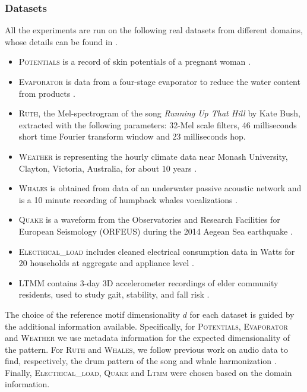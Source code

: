 \subsubsection*{Datasets}
All the experiments are run on the following real datasets from different domains, whose details can be found in .
\begin{itemize}
    \item \textsc{Potentials} is a record of skin potentials of a pregnant woman \cite{DaISyPREG}.
    \item \textsc{Evaporator} is data from a four-stage evaporator to reduce the water content from products \cite{DaISyEVAP}.
    \item \textsc{Ruth}, the Mel-spectrogram of the song \textit{Running Up That Hill} by Kate Bush, extracted with the following parameters: 32-Mel scale filters, 46 milliseconds short time Fourier transform window and 23 milliseconds hop.
    \item \textsc{Weather} is representing the hourly climate data near Monash University, Clayton, Victoria, Australia, for about $10$ years \cite{godahewa_2021_5184708}.
    \item \textsc{Whales} is obtained from data of an underwater passive acoustic network and is a 10 minute recording of humpback whales vocalizations \cite{NOAA_PIPAN_2021}.
    \item \textsc{Quake} is a waveform from the Observatories and Research Facilities for European Seismology (ORFEUS) during the 2014 Aegean Sea earthquake \cite{quake}.
    \item \textsc{Electrical\_load} includes cleaned electrical consumption data in Watts for 20 households at aggregate and appliance level \cite{PMID:28055033}.
    \item \textsc{LTMM} contains 3-day 3D accelerometer recordings of elder community residents, used to study gait, stability, and fall risk \cite{falldataset, fall}.
\end{itemize}

The choice of the reference motif dimensionality $d$ for each dataset is guided by the additional information available. Specifically, for \textsc{Potentials}, \textsc{Evaporator} and \textsc{Weather} we use metadata information for the expected dimensionality of the pattern. For \textsc{Ruth} and \textsc{Whales}, we follow previous work on audio data to find, respectively, the drum pattern of the song and whale harmonization \cite{keoghMP}. Finally, \textsc{Electrical\_load}, \textsc{Quake} and \textsc{Ltmm} were chosen based on the domain information.

